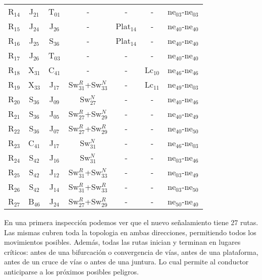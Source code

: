 \begin{table}[H]
{\begin{center}
{\begin{tabular}{ c c c c c c c }
					R$_{14}$  & J$_{21}$ & T$_{01}$ & - & - & - & ne$_{03}$-ne$_{03}$\\	
					R$_{15}$  & J$_{24}$ & J$_{26}$ & - & Plat$_{14}$ & - & ne$_{40}$-ne$_{40}$\\
					R$_{16}$  & J$_{25}$ & S$_{36}$ & - & Plat$_{14}$ & - & ne$_{40}$-ne$_{40}$\\			
					R$_{17}$  & J$_{26}$ & T$_{03}$ & - & - & - & ne$_{40}$-ne$_{40}$\\
					R$_{18}$  & X$_{31}$ & C$_{41}$ & - & - & Lc$_{10}$ & ne$_{46}$-ne$_{46}$\\
					R$_{19}$  & X$_{33}$ & J$_{17}$ & Sw$_{31}^{R}$+Sw$_{33}^{N}$ & - & Lc$_{11}$ & ne$_{49}$-ne$_{03}$\\
					R$_{20}$  & S$_{36}$ & J$_{09}$ & Sw$_{27}^{N}$ & - & - & ne$_{40}$-ne$_{46}$\\
					R$_{21}$  & S$_{36}$ & J$_{05}$ & Sw$_{27}^{R}$+Sw$_{29}^{N}$ & - & - & ne$_{40}$-ne$_{49}$\\				
					R$_{22}$  & S$_{36}$ & J$_{07}$ & Sw$_{27}^{R}$+Sw$_{29}^{R}$ & - & - & ne$_{40}$-ne$_{50}$\\
					R$_{23}$  & C$_{41}$ & J$_{17}$ & Sw$_{31}^{N}$ & - & - & ne$_{46}$-ne$_{03}$\\	
					R$_{24}$  & S$_{42}$ & J$_{16}$ & Sw$_{31}^{N}$ & - & - & ne$_{03}$-ne$_{46}$\\
					R$_{25}$  & S$_{42}$ & J$_{12}$ & Sw$_{31}^{R}$+Sw$_{33}^{N}$ & - & - & ne$_{03}$-ne$_{49}$\\	
					R$_{26}$  & S$_{42}$ & J$_{14}$ & Sw$_{31}^{R}$+Sw$_{33}^{R}$ & - & - & ne$_{03}$-ne$_{50}$\\	
					R$_{27}$  & B$_{46}$ & J$_{24}$ & Sw$_{27}^{R}$+Sw$_{29}^{R}$ & - & - & ne$_{50}$-ne$_{40}$\\
					\hline
				\end{tabular}
			}
			\end{center}
		}
	\end{table}
	
	En una primera inspección podemos ver que el nuevo señalamiento tiene 27 rutas. Las mismas cubren toda la topologia en ambas direcciones, permitiendo todos los movimientos posibles. Además, todas las rutas inician y terminan en lugares críticos: antes de una bifurcación o convergencia de vías, antes de una plataforma, antes de un cruce de vías o antes de una juntura. Lo cual permite al conductor anticiparse a los próximos posibles peligros.